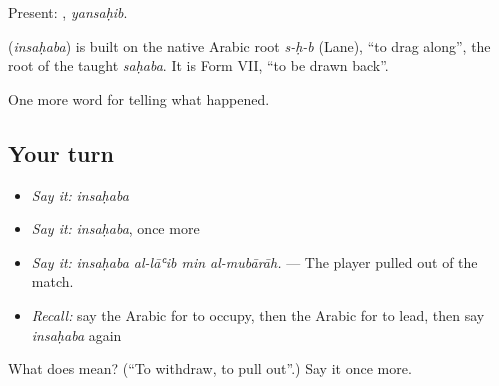 Present: , \emph{yansaḥib}.

\begin{cousinweb}
\textbf{} (\emph{insaḥaba}) is built on the native Arabic root \emph{s-ḥ-b} (Lane), \textquotedblleft{}to drag along\textquotedblright{}, the root of the taught \emph{saḥaba}. It is Form VII, \textquotedblleft{}to be drawn back\textquotedblright{}.
\end{cousinweb}

\begin{grammarlens}[title={What you've built}]
One more word for telling what happened.
\end{grammarlens}

\subsection*{Your turn}
\begin{itemize}
\raggedright
  \item \emph{Say it:} \emph{insaḥaba}
  \item \emph{Say it:} \emph{insaḥaba}, once more
  \item \emph{Say it:} \emph{insaḥaba al-lāʿib min al-mubārāh.} — The player pulled out of the match.
  \item \emph{Recall:} say the Arabic for to occupy, then the Arabic for to lead, then say \emph{insaḥaba} again
\end{itemize}

\begin{tcolorbox}[breakable,colback=teal!4,colframe=teal!35!black,title={Before you move on}]
What does  mean? (\textquotedblleft{}To withdraw, to pull out\textquotedblright{}.) Say it once more.
\end{tcolorbox}
